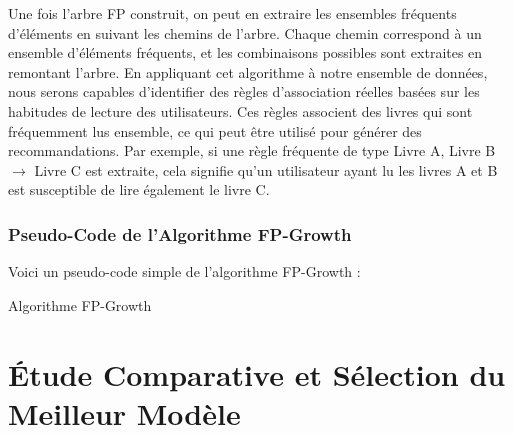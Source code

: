 \documentclass[a4paper, 12pt]{article}
\begin{document}
Une fois l'arbre FP construit, on peut en extraire les ensembles fréquents d'éléments en suivant les chemins de l'arbre. Chaque chemin correspond à un ensemble d'éléments fréquents, et les combinaisons possibles sont extraites en remontant l'arbre. En appliquant cet algorithme à notre ensemble de données, nous serons capables d'identifier des règles d'association réelles basées sur les habitudes de lecture des utilisateurs. Ces règles associent des livres qui sont fréquemment lus ensemble, ce qui peut être utilisé pour générer des recommandations. Par exemple, si une règle fréquente de type {Livre A, Livre B} $\rightarrow$ {Livre C} est extraite, cela signifie qu'un utilisateur ayant lu les livres A et B est susceptible de lire également le livre C.

\subsubsection{Pseudo-Code de l'Algorithme FP-Growth}

Voici un pseudo-code simple de l'algorithme FP-Growth :

\begin{algorithm}[H]
\SetAlgoLined
{}
  
\caption{Algorithme FP-Growth}
\end{algorithm}



    





\newpage
\section{Étude Comparative et Sélection du Meilleur Modèle}
\justifying
\end{document}
